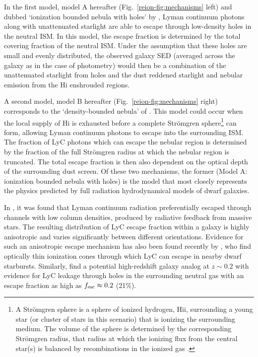 In the first model, model A hereafter (Fig.~\ref{reion-fig:mechanisms} left) and dubbed `ionization bounded nebula with holes' by \citeauthor{Zackrisson:2013iz}, Lyman continuum photons along with unattenuated starlight are able to escape through low-density holes in the neutral ISM. In this model, the escape fraction is determined by the total covering fraction of the neutral ISM. Under the assumption that these holes are small and evenly distributed, the observed galaxy SED (averaged across the galaxy as in the case of photometry) would then be a combination of the unattenuated starlight from holes and the dust reddened starlight and nebular emission from the H{\sc i} enshrouded regions.

A second model, model B hereafter (Fig.~\ref{reion-fig:mechanisms} right) corresponds to the `density-bounded nebula' of \citet{Zackrisson:2013iz}. This model could occur when the local supply of H{\sc i} is exhausted before a complete Str{\"o}mgren sphere\footnote{A Str{\"o}mgren sphere is a sphere of ionized hydrogen, H{\sc ii}, surrounding a young star (or cluster of stars in this scenario) that is ionizing the surrounding medium. The volume of the sphere is determined by the corresponding Str{\"o}mgren radius, that radius at which the ionizing flux from the central star(s) is balanced by recombinations in the ionized gas \citep{Stromgren:1939dq}.} can form, allowing Lyman continuum photons to escape into the surrounding ISM. The fraction of LyC photons which can escape the nebular region is determined by the fraction of the full Str{\"o}mgren radius at which the nebular region is truncated. The total escape fraction is then also dependent on the optical depth of the surrounding dust screen. Of these two mechanisms, the former (Model A: ionization bounded nebula with holes) is the model that most closely represents the physics predicted by full radiation hydrodynamical models of dwarf galaxies. 

In \citet{Wise:2009fn}, it was found that Lyman continuum radiation preferentially escaped through channels with low column densities, produced by radiative feedback from massive stars. The resulting distribution of LyC escape fraction within a galaxy is highly anisotropic and varies significantly between different orientations. Evidence for such an anisotropic escape mechanism has also been found recently by \citet{Zastrow:2013bg}, who find optically thin ionization cones through which LyC can escape in nearby dwarf starbursts. Similarly, \citet{Borthakur:2014bz} find a potential high-redshift galaxy analog at $z\sim0.2$ with evidence for LyC leakage through holes in the surrounding neutral gas with an escape fraction as high as $f_{\rm{esc}} \approx 0.2$ (21\%). 


